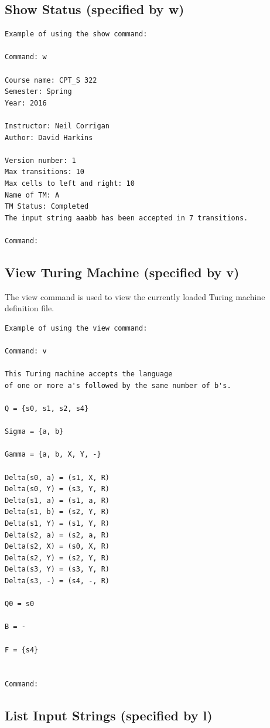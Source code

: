 \documentclass{report}
\begin{document}
\subsection{Show Status (specified by w)} 

\begin{verbatim}
Example of using the show command:

Command: w

Course name: CPT_S 322
Semester: Spring
Year: 2016

Instructor: Neil Corrigan
Author: David Harkins

Version number: 1
Max transitions: 10
Max cells to left and right: 10
Name of TM: A
TM Status: Completed
The input string aaabb has been accepted in 7 transitions.
    
Command: 
\end{verbatim}

\subsection{View Turing Machine (specified by v)} 

The view command is used to view the currently loaded Turing machine definition file.

\begin{verbatim}
Example of using the view command:

Command: v

This Turing machine accepts the language 
of one or more a's followed by the same number of b's.

Q = {s0, s1, s2, s4}
	
Sigma = {a, b}

Gamma = {a, b, X, Y, -}

Delta(s0, a) = (s1, X, R)
Delta(s0, Y) = (s3, Y, R)
Delta(s1, a) = (s1, a, R)
Delta(s1, b) = (s2, Y, R)
Delta(s1, Y) = (s1, Y, R)
Delta(s2, a) = (s2, a, R)
Delta(s2, X) = (s0, X, R)
Delta(s2, Y) = (s2, Y, R)
Delta(s3, Y) = (s3, Y, R)
Delta(s3, -) = (s4, -, R)

Q0 = s0

B = -

F = {s4}


Command: 
\end{verbatim}

\subsection{List Input Strings (specified by l)} 
\end{document}
